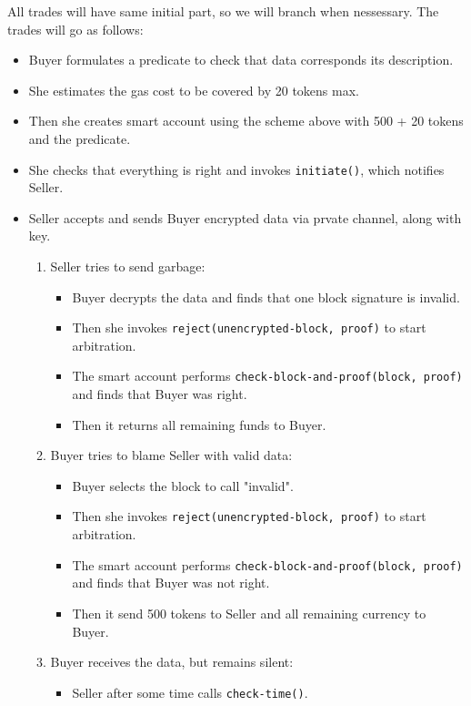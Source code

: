 \documentclass[a4paper]{article}
\begin{document}
All trades will have same initial part, so we will branch when nessessary.
The trades will go as follows:
\begin{itemize}
  \item Buyer formulates a predicate to check that data corresponds its description.

  \item She estimates the gas cost to be covered by 20 tokens max.

  \item Then she creates smart account using the scheme above with 500 + 20 tokens and the predicate.

  \item She checks that everything is right and invokes \verb|initiate()|, which notifies Seller.

  \item Seller accepts and sends Buyer encrypted data via prvate channel, along with key.

  \begin{enumerate}
    \item Seller tries to send garbage:
      \begin{itemize}
        \item Buyer decrypts the data and finds that one block signature is invalid.

        \item Then she invokes \verb|reject(unencrypted-block, proof)| to start arbitration.

        \item The smart account performs \verb|check-block-and-proof(block, proof)| and finds that Buyer was right.

        \item Then it returns all remaining funds to Buyer.
      \end{itemize}
    \item Buyer tries to blame Seller with valid data:
      \begin{itemize}
        \item Buyer selects the block to call "invalid".

        \item Then she invokes \verb|reject(unencrypted-block, proof)| to start arbitration.

        \item The smart account performs \verb|check-block-and-proof(block, proof)| and finds that Buyer was not right.

        \item Then it send 500 tokens to Seller and all remaining currency to Buyer.
      \end{itemize}
    \item Buyer receives the data, but remains silent:
      \begin{itemize}
        \item Seller after some time calls \verb|check-time()|.


\end{itemize}
\end{enumerate}
\end{itemize}
\end{document}
